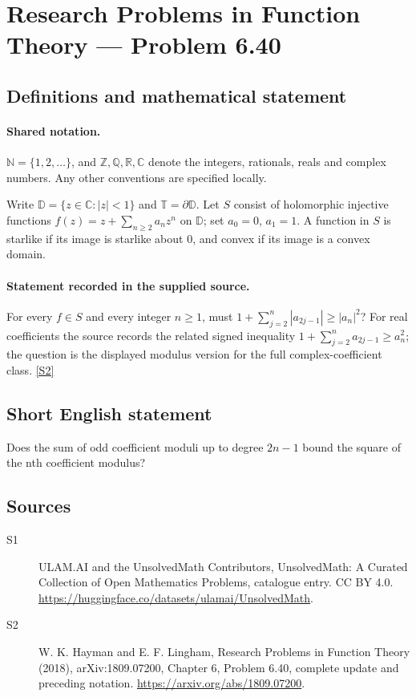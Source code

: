 \documentclass[11pt]{article}
\newcommand{\sref}[2]{\hyperlink{source:#1:#2}{[S#2]}}
\begin{document}
\section{Research Problems in Function Theory — Problem 6.40}\label{statement}

\subsection{Definitions and mathematical statement}

\paragraph{Shared notation.}$\mathbb N=\{1,2,\ldots\}$, and $\mathbb Z,\mathbb Q,\mathbb R,\mathbb C$ denote the integers, rationals, reals and complex numbers. Any other conventions are specified locally.


Write $\mathbb D=\{z\in\mathbb C:|z|<1\}$ and $\mathbb T=\partial\mathbb D$. Let $S$ consist of holomorphic injective functions $f(z)=z+\sum_{n\ge2}a_nz^n$ on $\mathbb D$; set $a_0=0$, $a_1=1$. A function in $S$ is starlike if its image is starlike about $0$, and convex if its image is a convex domain.
\paragraph{Statement recorded in the supplied source.}
For every $f\in S$ and every integer $n\ge1$, must $1+\sum_{j=2}^{n}|a_{2j-1}|\ge|a_n|^2$? For real coefficients the source records the related signed inequality $1+\sum_{j=2}^{n}a_{2j-1}\ge a_n^2$; the question is the displayed modulus version for the full complex-coefficient class. \sref{statement}{2}
\subsection{Short English statement}
Does the sum of odd coefficient moduli up to degree $2n-1$ bound the square of the nth coefficient modulus?
\subsection{Sources}
\begin{description}
\item[\hypertarget{source:statement:1}{S1}] ULAM.AI and the UnsolvedMath Contributors, UnsolvedMath: A Curated Collection of Open Mathematics Problems, catalogue entry. CC BY 4.0. \url{https://huggingface.co/datasets/ulamai/UnsolvedMath}.
\item[\hypertarget{source:statement:2}{S2}] W. K. Hayman and E. F. Lingham, Research Problems in Function Theory (2018), arXiv:1809.07200, Chapter 6, Problem 6.40, complete update and preceding notation. \url{https://arxiv.org/abs/1809.07200}.
\end{description}
\label{end:statement}
\end{document}
